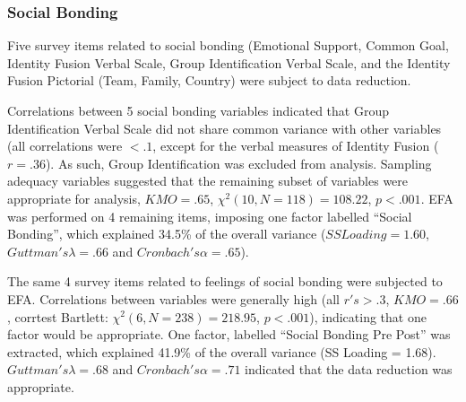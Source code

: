 \begin{CJK}{UTF8}{gbsn}



\subsubsection{Social Bonding}
Five survey items related to social bonding (Emotional Support, Common Goal, Identity Fusion Verbal Scale, Group Identification Verbal Scale, and the Identity Fusion Pictorial (Team, Family, Country) were subject to data reduction.


Correlations between 5 social bonding variables indicated that Group Identification Verbal Scale did not share common variance with other variables (all correlations were $<.1$, except for the verbal measures of Identity Fusion ($r =.36$). As such, Group Identification was excluded from analysis.  Sampling adequacy variables suggested that the remaining subset of variables were appropriate for analysis, $KMO = .65$, $\chi^2(10, N = 118) = 108.22$, $p < .001$.  EFA was performed on 4 remaining items, imposing one factor labelled ``Social Bonding'', which explained 34.5\% of the overall variance ($SS Loading = 1.60$, $Guttman's \lambda =.66$ and $Cronbach's \alpha = .65$).

The same 4 survey items related to feelings of social bonding were subjected to EFA.  Correlations between variables were generally high (all $r's > .3$, $KMO = .66$, corrtest Bartlett: $\chi^2(6, N = 238) = 218.95$, $p < .001$), indicating that one factor would be appropriate.  One factor, labelled ``Social Bonding Pre Post'' was extracted, which explained 41.9\% of the overall variance (SS Loading = 1.68).  $Guttman's \lambda =.68$ and $Cronbach's \alpha = .71$ indicated that the data reduction was appropriate.


\end{CJK}
